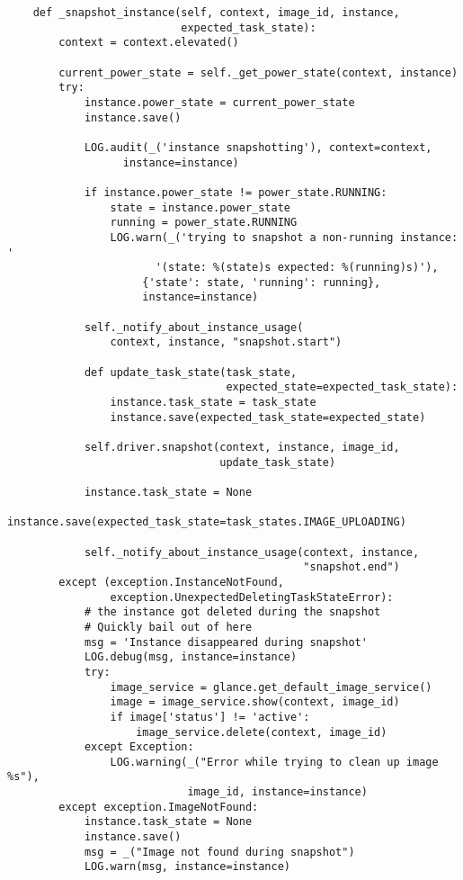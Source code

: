 \documentclass[a4paper,left=1.5cm,right=1.5cm,11pt]{article}
\begin{document}
    \begin{lstlisting}
    def _snapshot_instance(self, context, image_id, instance,
                           expected_task_state):
        context = context.elevated()

        current_power_state = self._get_power_state(context, instance)
        try:
            instance.power_state = current_power_state
            instance.save()

            LOG.audit(_('instance snapshotting'), context=context,
                  instance=instance)

            if instance.power_state != power_state.RUNNING:
                state = instance.power_state
                running = power_state.RUNNING
                LOG.warn(_('trying to snapshot a non-running instance: '
                       '(state: %(state)s expected: %(running)s)'),
                     {'state': state, 'running': running},
                     instance=instance)

            self._notify_about_instance_usage(
                context, instance, "snapshot.start")

            def update_task_state(task_state,
                                  expected_state=expected_task_state):
                instance.task_state = task_state
                instance.save(expected_task_state=expected_state)

            self.driver.snapshot(context, instance, image_id,
                                 update_task_state)

            instance.task_state = None
            instance.save(expected_task_state=task_states.IMAGE_UPLOADING)

            self._notify_about_instance_usage(context, instance,
                                              "snapshot.end")
        except (exception.InstanceNotFound,
                exception.UnexpectedDeletingTaskStateError):
            # the instance got deleted during the snapshot
            # Quickly bail out of here
            msg = 'Instance disappeared during snapshot'
            LOG.debug(msg, instance=instance)
            try:
                image_service = glance.get_default_image_service()
                image = image_service.show(context, image_id)
                if image['status'] != 'active':
                    image_service.delete(context, image_id)
            except Exception:
                LOG.warning(_("Error while trying to clean up image %s"),
                            image_id, instance=instance)
        except exception.ImageNotFound:
            instance.task_state = None
            instance.save()
            msg = _("Image not found during snapshot")
            LOG.warn(msg, instance=instance)
    \end{lstlisting}
\end{document}
